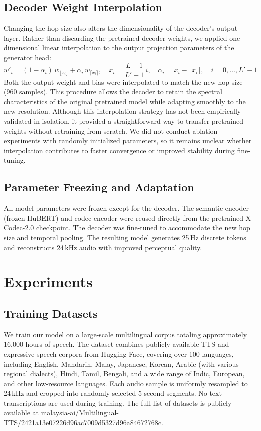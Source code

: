 \documentclass[preprint]{article}
\renewenvironment{equation}{\begin{equation*}}{\end{equation*}}
\begin{document}
\subsection{Decoder Weight Interpolation}
Changing the hop size also alters the dimensionality of the decoder's output layer. Rather than discarding the pretrained decoder weights, we applied one-dimensional linear interpolation to the output projection parameters of the generator head:
\begin{equation}
w'_i = (1 - \alpha_i)\, w_{\lfloor x_i \rfloor} + \alpha_i\, w_{\lceil x_i \rceil}, 
\quad 
x_i = \frac{L - 1}{L' - 1} \, i,
\quad 
\alpha_i = x_i - \lfloor x_i \rfloor,
\quad 
i = 0, \ldots, L' - 1
\end{equation}
Both the output weight and bias were interpolated to match the new hop size (960 samples). 
This procedure allows the decoder to retain the spectral characteristics of the original pretrained model while adapting smoothly to the new resolution. 
Although this interpolation strategy has not been empirically validated in isolation, it provided a straightforward way to transfer pretrained weights without retraining from scratch. 
We did not conduct ablation experiments with randomly initialized parameters, so it remains unclear whether interpolation contributes to faster convergence or improved stability during fine-tuning.

\subsection{Parameter Freezing and Adaptation}
All model parameters were frozen except for the decoder. The semantic encoder (frozen HuBERT) and codec encoder were reused directly from the pretrained X-Codec-2.0 checkpoint. The decoder was fine-tuned to accommodate the new hop size and temporal pooling. The resulting model generates 25\,Hz discrete tokens and reconstructs 24\,kHz audio with improved perceptual quality.

\section{Experiments}

\subsection{Training Datasets}
We train our model on a large-scale multilingual corpus totaling approximately 16,000 hours of speech. 
The dataset combines publicly available TTS and expressive speech corpora from Hugging Face, covering over 100 languages, including English, Mandarin, Malay, Japanese, Korean, Arabic (with various regional dialects), Hindi, Tamil, Bengali, and a wide range of Indic, European, and other low-resource languages.
Each audio sample is uniformly resampled to 24\,kHz and cropped into randomly selected 5-second segments. 
No text transcriptions are used during training. 
The full list of datasets is publicly available at \href{https://huggingface.co/datasets/malaysia-ai/Multilingual-TTS/blob/2421a13e07226d96ac7009d5327d96a84672768c/README.md}{malaysia-ai/Multilingual-TTS/2421a13e07226d96ac7009d5327d96a84672768c}.
\end{document}

